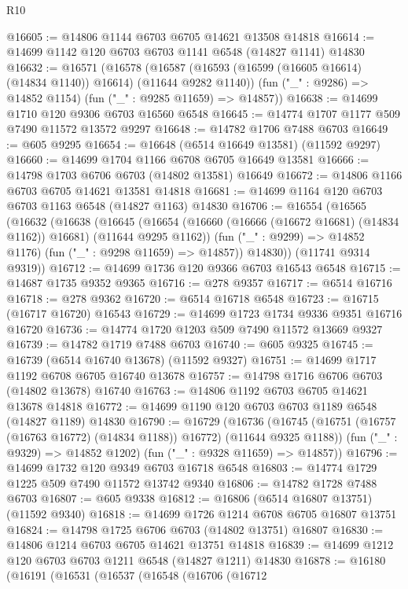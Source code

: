 \begin{lexlean}{R10}
\begin{coremodule}
@16605 := @14806 @1144 @6703 @6705 @14621 @13508 @14818
@16614 := @14699 @1142 @120 @6703 @6703 @1141 @6548 (@14827 @1141) @14830
@16632 := @16571
    (@16578
      (@16587 (@16593 (@16599 (@16605 @16614) (@14834 @1140)) @16614) (@11644 @9282 @1140))
      (fun ("_" : @9286) => @14852 @1154)
      (fun ("_" : @9285 @11659) => @14857))
@16638 := @14699 @1710 @120 @9306 @6703 @16560 @6548
@16645 := @14774 @1707 @1177 @509 @7490 @11572 @13572 @9297
@16648 := @14782 @1706 @7488 @6703
@16649 := @605 @9295
@16654 := @16648 (@6514 @16649 @13581) (@11592 @9297)
@16660 := @14699 @1704 @1166 @6708 @6705 @16649 @13581
@16666 := @14798 @1703 @6706 @6703 (@14802 @13581) @16649
@16672 := @14806 @1166 @6703 @6705 @14621 @13581 @14818
@16681 := @14699 @1164 @120 @6703 @6703 @1163 @6548 (@14827 @1163) @14830
@16706 := @16554
    (@16565
      (@16632
        (@16638
          (@16645
            (@16654 (@16660 (@16666 (@16672 @16681) (@14834 @1162)) @16681) (@11644 @9295 @1162))
            (fun ("_" : @9299) => @14852 @1176)
            (fun ("_" : @9298 @11659) => @14857))
          @14830))
      (@11741 @9314 @9319))
@16712 := @14699 @1736 @120 @9366 @6703 @16543 @6548
@16715 := @14687 @1735 @9352 @9365
@16716 := @278 @9357
@16717 := @6514 @16716
@16718 := @278 @9362
@16720 := @6514 @16718 @6548
@16723 := @16715 (@16717 @16720) @16543
@16729 := @14699 @1723 @1734 @9336 @9351 @16716 @16720
@16736 := @14774 @1720 @1203 @509 @7490 @11572 @13669 @9327
@16739 := @14782 @1719 @7488 @6703
@16740 := @605 @9325
@16745 := @16739 (@6514 @16740 @13678) (@11592 @9327)
@16751 := @14699 @1717 @1192 @6708 @6705 @16740 @13678
@16757 := @14798 @1716 @6706 @6703 (@14802 @13678) @16740
@16763 := @14806 @1192 @6703 @6705 @14621 @13678 @14818
@16772 := @14699 @1190 @120 @6703 @6703 @1189 @6548 (@14827 @1189) @14830
@16790 := @16729
    (@16736
      (@16745 (@16751 (@16757 (@16763 @16772) (@14834 @1188)) @16772) (@11644 @9325 @1188))
      (fun ("_" : @9329) => @14852 @1202)
      (fun ("_" : @9328 @11659) => @14857))
@16796 := @14699 @1732 @120 @9349 @6703 @16718 @6548
@16803 := @14774 @1729 @1225 @509 @7490 @11572 @13742 @9340
@16806 := @14782 @1728 @7488 @6703
@16807 := @605 @9338
@16812 := @16806 (@6514 @16807 @13751) (@11592 @9340)
@16818 := @14699 @1726 @1214 @6708 @6705 @16807 @13751
@16824 := @14798 @1725 @6706 @6703 (@14802 @13751) @16807
@16830 := @14806 @1214 @6703 @6705 @14621 @13751 @14818
@16839 := @14699 @1212 @120 @6703 @6703 @1211 @6548 (@14827 @1211) @14830
@16878 := @16180
    (@16191
      (@16531
        (@16537
          (@16548
            (@16706
              (@16712

\end{coremodule}
\end{lexlean}
